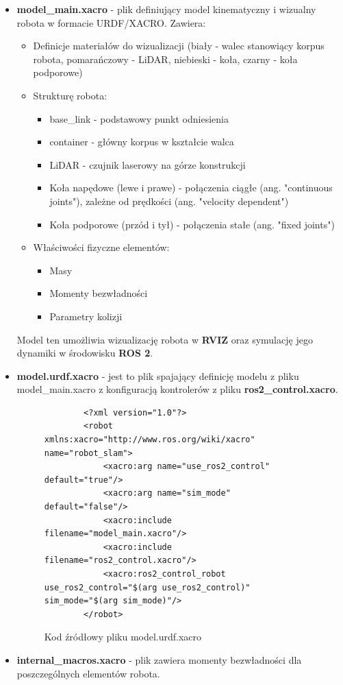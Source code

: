 \documentclass[a4paper,twoside,12pt]{book}
\begin{document}
\begin{itemize}
	\item \textbf{model\_main.xacro} - plik definiujący model kinematyczny i wizualny robota w formacie URDF/XACRO. Zawiera:
		\begin{itemize}
			\item Definicje materiałów do wizualizacji (biały - walec stanowiący korpus robota, pomarańczowy - LiDAR, niebieski - koła, czarny - koła podporowe)
			\item Strukturę robota:
			\begin{itemize}
				\item base\_link - podstawowy punkt odniesienia
				\item container - główny korpus w kształcie walca
				\item LiDAR - czujnik laserowy na górze konstrukcji
				\item Koła napędowe (lewe i prawe) - połączenia ciągłe (ang. "continuous joints"), zależne od prędkości (ang. "velocity dependent")
				\item Koła podporowe (przód i tył) - połączenia stałe (ang. "fixed joints")
			\end{itemize}
			\item Właściwości fizyczne elementów:
			\begin{itemize}
				\item Masy
				\item Momenty bezwładności
				\item Parametry kolizji
			\end{itemize}
		\end{itemize}
		Model ten umożliwia wizualizację robota w \textbf{RVIZ} oraz symulację jego dynamiki w środowisku \textbf{ROS 2}.
\newpage
	
	\item \textbf{model.urdf.xacro} - jest to plik spajający definicję modelu z pliku model\_main.xacro z konfiguracją kontrolerów z pliku \textbf{ros2\_control.xacro}.
	
	\begin{figure}[!hb]
		\centering
	\begin{lstlisting}
		<?xml version="1.0"?>
		<robot xmlns:xacro="http://www.ros.org/wiki/xacro" name="robot_slam">
			<xacro:arg name="use_ros2_control" default="true"/>
			<xacro:arg name="sim_mode" default="false"/>
			<xacro:include filename="model_main.xacro"/>
			<xacro:include filename="ros2_control.xacro"/>
			<xacro:ros2_control_robot use_ros2_control="$(arg use_ros2_control)" sim_mode="$(arg sim_mode)"/>
		</robot>
		\end{lstlisting}
		\caption{Kod źródłowy pliku model.urdf.xacro}
		\label{fig:model.urdf.xacro}
	\end{figure}
	\item \textbf{internal\_macros.xacro} - plik zawiera momenty bezwładności dla poszczególnych elementów robota.


\end{itemize}
\end{document}
